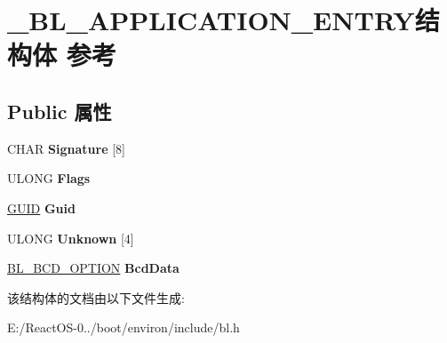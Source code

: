 \hypertarget{struct___b_l___a_p_p_l_i_c_a_t_i_o_n___e_n_t_r_y}{}\section{\+\_\+\+B\+L\+\_\+\+A\+P\+P\+L\+I\+C\+A\+T\+I\+O\+N\+\_\+\+E\+N\+T\+R\+Y结构体 参考}
\label{struct___b_l___a_p_p_l_i_c_a_t_i_o_n___e_n_t_r_y}
\subsection*{Public 属性}
\begin{DoxyCompactItemize}
\item 
\mbox{\label{struct___b_l___a_p_p_l_i_c_a_t_i_o_n___e_n_t_r_y_a59e1fab5f98799d4e4501986c99467b2}} 
C\+H\+AR {\bfseries Signature} \mbox{[}8\mbox{]}
\item 
\mbox{\label{struct___b_l___a_p_p_l_i_c_a_t_i_o_n___e_n_t_r_y_a26e362c8f620f46fe72c3cbc2ca5932e}} 
U\+L\+O\+NG {\bfseries Flags}
\item 
\mbox{\label{struct___b_l___a_p_p_l_i_c_a_t_i_o_n___e_n_t_r_y_a5f827460486544b96884a61a484cdc62}} 
\hyperlink{interface_g_u_i_d}{G\+U\+ID} {\bfseries Guid}
\item 
\mbox{\label{struct___b_l___a_p_p_l_i_c_a_t_i_o_n___e_n_t_r_y_afe7124480b16cb742fa47c867e606209}} 
U\+L\+O\+NG {\bfseries Unknown} \mbox{[}4\mbox{]}
\item 
\mbox{\label{struct___b_l___a_p_p_l_i_c_a_t_i_o_n___e_n_t_r_y_af2f93510128013c20a6415c8326964b0}} 
\hyperlink{struct___b_l___b_c_d___o_p_t_i_o_n}{B\+L\+\_\+\+B\+C\+D\+\_\+\+O\+P\+T\+I\+ON} {\bfseries Bcd\+Data}
\end{DoxyCompactItemize}


该结构体的文档由以下文件生成\+:\begin{DoxyCompactItemize}
\item 
E\+:/\+React\+O\+S-\/0../boot/environ/include/bl.\+h\end{DoxyCompactItemize}
